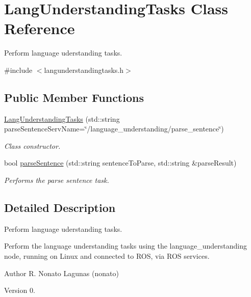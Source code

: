 \hypertarget{class_lang_understanding_tasks}{}\section{Lang\+Understanding\+Tasks Class Reference}
\label{class_lang_understanding_tasks}


Perform language uderstanding tasks.  




{\ttfamily \#include $<$langunderstandingtasks.\+h$>$}

\subsection*{Public Member Functions}
\begin{DoxyCompactItemize}
\item 
\hyperlink{class_lang_understanding_tasks_ab62c51df68d09c726595e8053b866b1e}{Lang\+Understanding\+Tasks} (std\+::string parse\+Sentence\+Serv\+Name=\char`\"{}/language\+\_\+understanding/parse\+\_\+sentence\char`\"{})
\begin{DoxyCompactList}\small\item\em Class constructor. \end{DoxyCompactList}\item 
bool \hyperlink{class_lang_understanding_tasks_a583713f7ba207bb1cba59a9ccccfb536}{parse\+Sentence} (std\+::string sentence\+To\+Parse, std\+::string \&parse\+Result)
\begin{DoxyCompactList}\small\item\em Performs the parse sentence task. \end{DoxyCompactList}\end{DoxyCompactItemize}


\subsection{Detailed Description}
Perform language uderstanding tasks. 

Perform the language understanding tasks using the language\+\_\+understanding node, running on Linux and connected to R\+OS, via R\+OS services.

\begin{DoxyAuthor}{Author}
R. Nonato Lagunas (nonato) 
\end{DoxyAuthor}
\begin{DoxyVersion}{Version}
0. 
\end{DoxyVersion}


